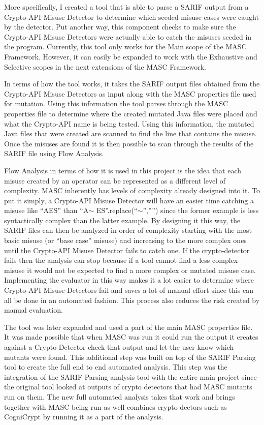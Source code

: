 More specifically, I created a tool that is able to parse a SARIF output from a Crypto-API Misuse Detector to determine which seeded misuse cases were caught by the detector.  Put another way, this component checks to make sure the Crypto-API Misuse Detectors were actually able to catch the misuses seeded in the program. Currently, this tool only works for the Main scope of the MASC Framework.  However, it can easily be expanded to work with the Exhaustive and Selective scopes in the next extensions of the MASC Framework. 
    
In terms of how the tool works, it takes the SARIF output files obtained from the Crypto-API Misuse Detectors as input along with the MASC properties file used for mutation. Using this information the tool parses through the MASC properties file to determine where the created mutated Java files were placed and what the Crypto-API name is being tested.  Using this information, the mutated Java files that were created are scanned to find the line that contains the misuse.  Once the misuses are found it is then possible to scan through the results of the SARIF file using Flow Analysis.

Flow Analysis in terms of how it is used in this project is the idea that each misuse created by an operator can be represented as a different level of complexity.  MASC inherently has levels of complexity already designed into it. To put it simply, a Crypto-API Misuse Detector will have an easier time catching a misuse like “AES” than “A$\sim$ ES”.replace(“$\sim$”,””) since the former example is less syntactically complex than the latter example. By designing it this way, the SARIF files can then be analyzed in order of complexity starting with the most basic misuse (or “base case” misuse) and increasing to the more complex ones until the Crypto-API Misuse Detector fails to catch one. If the crypto-detector fails then the analysis can stop because if a tool cannot find a less complex misuse it would not be expected to find a more complex or mutated misuse case.  Implementing the evaluator in this way makes it a lot easier to determine where Crypto-API Misuse Detectors fail and saves a lot of manual effort since this can all be done in an automated fashion.  This process also reduces the risk created by manual evaluation. 

The tool was later expanded and used a part of the main MASC properties file. It was made possible that when MASC was run it could run the output it creates against a Crypto Detector check that output and let the user know which mutants were found. This additional step was built on top of the SARIF Parsing tool to create the full end to end automated analysis. This step was the integration of the SARIF Parsing analysis tool with the entire main project since the original tool looked at outputs of crypto detectors that had MASC mutants run on them. The new full automated analysis takes that work and brings together with MASC being run as well combines crypto-dectors such as CogniCrypt by running it as a part of the analysis.

